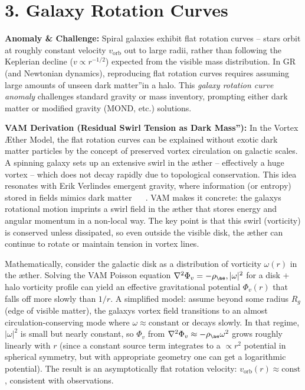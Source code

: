 \documentclass[a4paper, aps,preprint,superscriptaddress, 12pt]{revtex4}
\begin{document}
\section*{3. Galaxy Rotation Curves}

\textbf{Anomaly \& Challenge: } Spiral galaxies exhibit flat rotation curves – stars orbit at roughly constant velocity $v_{\text{orb}}$ out to large radii, rather than following the Keplerian decline ($v \propto r^{-1/2}$) expected from the visible mass distribution. In GR (and Newtonian dynamics), reproducing flat rotation curves requires assuming large amounts of unseen \grqq dark matter\textquotedblright in a halo. This \textit{galaxy rotation curve anomaly} challenges standard gravity or mass inventory, prompting either dark matter or modified gravity (MOND, etc.) solutions.


\textbf{VAM Derivation (Residual Swirl Tension as \grqq Dark Mass\textquotedblright):} In the Vortex Æther Model, the flat rotation curves can be explained without exotic dark matter particles by the concept of preserved vortex circulation on galactic scales. A spinning galaxy sets up an extensive swirl in the æther – effectively a huge vortex – which does not decay rapidly due to topological conservation. This idea resonates with Erik Verlinde\rqs s emergent gravity, where information (or entropy) stored in fields mimics dark matter~\cite{Iskandarani2025c} ~\cite{Iskandarani2025c} . VAM makes it concrete: the galaxy\rqs s rotational motion imprints a swirl field in the æther that stores energy and angular momentum in a non-local way. The key point is that this swirl (vorticity) is conserved unless dissipated, so even outside the visible disk, the æther can continue to rotate or maintain tension in vortex lines.


Mathematically, consider the galactic disk as a distribution of vorticity $\omega(r)$ in the æther. Solving the VAM Poisson equation $\nabla^2 \Phi_v = -\rho_{\ae},|\omega|^2$ for a disk + halo vorticity profile can yield an effective gravitational potential $\Phi_v(r)$ that falls off more slowly than $1/r$. A simplified model: assume beyond some radius $R_g$ (edge of visible matter), the galaxy\rqs s vortex field transitions to an almost circulation-conserving mode where $\omega \approx \text{constant}$ or decays slowly. In that regime, $|\omega|^2$ is small but nearly constant, so $\Phi_v$ from $\nabla^2 \Phi_v \approx -\rho_{\ae}\omega^2$ grows roughly linearly with $r$ (since a constant source term integrates to a $\propto r^2$ potential in spherical symmetry, but with appropriate geometry one can get a logarithmic potential). The result is an asymptotically flat rotation velocity: $v_{\text{orb}}(r) \approx \text{const}$, consistent with observations.
\end{document}
